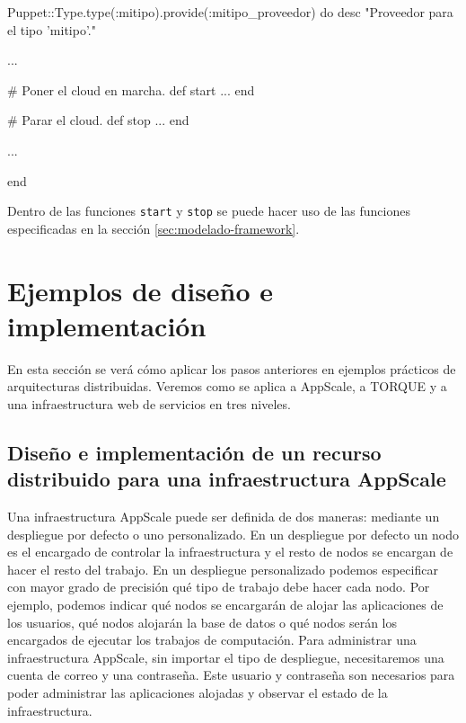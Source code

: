 \begin{rubycode}
Puppet::Type.type(:mitipo).provide(:mitipo_proveedor) do
   desc "Proveedor para el tipo 'mitipo'."

   ...

   # Poner el cloud en marcha.
   def start
      ...
   end

   # Parar el cloud.
   def stop
      ...
   end
   
   ...
   
end
\end{rubycode}

Dentro de las funciones \texttt{start} y \texttt{stop} se puede hacer uso de las funciones especificadas en la sección \ref{sec:modelado-framework}.

\section{Ejemplos de diseño e implementación}

En esta sección se verá cómo aplicar los pasos anteriores en ejemplos prácticos de arquitecturas distribuidas. Veremos como se aplica a AppScale, a TORQUE y a una infraestructura web de servicios en tres niveles.

\subsection{Diseño e implementación de un recurso distribuido para una infraestructura AppScale}

Una infraestructura AppScale puede ser definida de dos maneras: mediante un despliegue por defecto o uno personalizado. En un despliegue por defecto un nodo es el encargado de controlar la infraestructura y el resto de nodos se encargan de hacer el resto del trabajo. En un despliegue personalizado podemos especificar con mayor grado de precisión qué tipo de trabajo debe hacer cada nodo. Por ejemplo, podemos indicar qué nodos se encargarán de alojar las aplicaciones de los usuarios, qué nodos alojarán la base de datos o qué nodos serán los encargados de ejecutar los trabajos de computación. Para administrar una infraestructura AppScale, sin importar el tipo de despliegue, necesitaremos una cuenta de correo y una contraseña. Este usuario y contraseña son necesarios para poder administrar las aplicaciones alojadas y observar el estado de la infraestructura. \\

